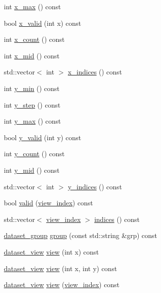 \begin{DoxyCompactItemize}
\item 
int \hyperlink{classtlz_1_1dataset_a280e3ae6c4b37e1e18fabf00b70be20a}{x\+\_\+max} () const 
\item 
bool \hyperlink{classtlz_1_1dataset_a52d7087aa473ea89d7dceb8573fbb891}{x\+\_\+valid} (int x) const 
\item 
int \hyperlink{classtlz_1_1dataset_a5cb3c59b94a7ef95ca960f1fd54ac073}{x\+\_\+count} () const 
\item 
int \hyperlink{classtlz_1_1dataset_acff1e030f5c941654ea16f8061f49346}{x\+\_\+mid} () const 
\item 
std\+::vector$<$ int $>$ \hyperlink{classtlz_1_1dataset_a65be94a892ff59fd841da913a82e8473}{x\+\_\+indices} () const 
\item 
int \hyperlink{classtlz_1_1dataset_a3a77e1219653f07bef6ec7b08cbf7dcf}{y\+\_\+min} () const 
\item 
int \hyperlink{classtlz_1_1dataset_a95703f1285ba42a810d46644128daf9a}{y\+\_\+step} () const 
\item 
int \hyperlink{classtlz_1_1dataset_a6900b6a88a2ac1e23d1a51da20f650e4}{y\+\_\+max} () const 
\item 
bool \hyperlink{classtlz_1_1dataset_a9a73a6159ffd2559c604427280feb14f}{y\+\_\+valid} (int y) const 
\item 
int \hyperlink{classtlz_1_1dataset_a38f70e46d98245e355797dc60ec5c970}{y\+\_\+count} () const 
\item 
int \hyperlink{classtlz_1_1dataset_a1183ab5dd7eab8ff6478d9105dc5da19}{y\+\_\+mid} () const 
\item 
std\+::vector$<$ int $>$ \hyperlink{classtlz_1_1dataset_a0d129cd61ee21c60210640147cd139ae}{y\+\_\+indices} () const 
\item 
bool \hyperlink{classtlz_1_1dataset_acef78cfe5bb77142cbd71e420f36e48b}{valid} (\hyperlink{structtlz_1_1view__index}{view\+\_\+index}) const 
\item 
std\+::vector$<$ \hyperlink{structtlz_1_1view__index}{view\+\_\+index} $>$ \hyperlink{classtlz_1_1dataset_a8214662ec50b7214c1e5993185247a0a}{indices} () const 
\item 
\hyperlink{classtlz_1_1dataset__group}{dataset\+\_\+group} \hyperlink{classtlz_1_1dataset_ad7d438f87e20fd0a734aabff2e6d52a9}{group} (const std\+::string \&grp) const 
\item 
\hyperlink{classtlz_1_1dataset__view}{dataset\+\_\+view} \hyperlink{classtlz_1_1dataset_acbdb309b8dd22f687fff41f6e9ac6ed4}{view} (int x) const 
\item 
\hyperlink{classtlz_1_1dataset__view}{dataset\+\_\+view} \hyperlink{classtlz_1_1dataset_a066516e36938a8579945edcc59d25493}{view} (int x, int y) const 
\item 
\hyperlink{classtlz_1_1dataset__view}{dataset\+\_\+view} \hyperlink{classtlz_1_1dataset_a3eedfdf0dac9e02440bc3e903299b199}{view} (\hyperlink{structtlz_1_1view__index}{view\+\_\+index}) const 
\end{DoxyCompactItemize}


